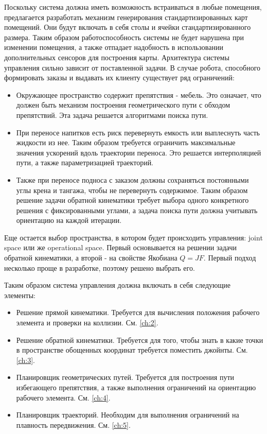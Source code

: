 Поскольку система должна иметь возможность встраиваться в любые помещения, предлагается разработать механизм генерирования стандартизированных карт помещений. Они будут включать в себя столы и ячейки стандартизированного размера. Таким образом работоспособность системы не будет нарушена при изменении помещения, а также отпадает надобность в использовании дополнительных сенсоров для построения карты.
Архитектура системы управления сильно зависит от поставленной задачи. В случае робота, способного формировать заказы и выдавать их клиенту существует ряд ограничений:
\begin{itemize}
	\item Окружающее пространство содержит препятствия - мебель. Это означает, что должен быть механизм построения геометрического пути с обходом препятствий. Эта задача решается алгоритмами поиска пути.
	\item При переносе напитков есть риск перевернуть емкость или выплеснуть часть жидкости из нее. Таким образом требуется ограничить максимальные значения ускорений вдоль траектории переноса. Это решается интерполяцией пути, а также параметризацией траекторий. 
	\item Также при переносе подноса с заказом должны сохраняться постоянными углы крена и тангажа, чтобы не перевернуть содержимое. Таким образом решение задачи обратной кинематики требует выбора одного конкретного решения с фиксированными углами, а задача поиска пути должна учитывать ориентацию на каждой итерации.
\end{itemize}

Еще остается выбор пространства, в котором будет происходить управления: joint space или же operational space. Первый основывается на решении задачи обратной кинематики, а второй - на свойстве Якобиана $Q = JF$. Первый подход несколько проще в разработке, поэтому решено выбрать его.

Таким образом система управления должна включать в себя следующие элементы:
\begin{itemize}
	\item Решение прямой кинематики. Требуется для вычисления положения рабочего элемента и проверки на коллизии. См. \ref{ch:2}.
	\item Решение обратной кинематики. Требуется для того, чтобы знать в какие точки в пространстве обощенных координат требуется поместить джойнты. См. \ref{ch:3}.
	\item Планировщик геометрических путей. Требуется для построения пути избегающего препятствия, а также выполнения ограничений на ориентацию рабочего элемента. См. \ref{ch:4}.
	\item Планировщик траекторий. Необходим для выполнения ограничений на плавность передвижения. См. \ref{ch:5}.
\end{itemize}

